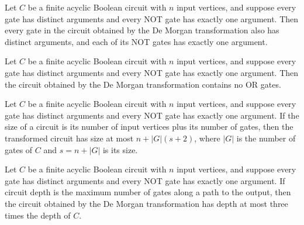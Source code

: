 \begin{theorem}
\label{BoolCircuit.DAGCircuit.deMorgan_isWellFormed}
\leanok
{}
Let $C$ be a finite acyclic Boolean circuit with $n$ input vertices, and suppose every
gate has distinct arguments and every NOT gate has exactly one argument. Then every gate
in the circuit obtained by the De Morgan transformation also has distinct arguments, and
each of its NOT gates has exactly one argument.
\end{theorem}

\begin{theorem}
\label{BoolCircuit.DAGCircuit.deMorgan_kind_ne_or}
\leanok
{}
Let $C$ be a finite acyclic Boolean circuit with $n$ input vertices, and suppose every
gate has distinct arguments and every NOT gate has exactly one argument. Then the
circuit obtained by the De Morgan transformation contains no OR gates.
\end{theorem}

\begin{theorem}
\label{BoolCircuit.DAGCircuit.deMorgan_size_le}
\leanok
{}
Let $C$ be a finite acyclic Boolean circuit with $n$ input vertices, and suppose every
gate has distinct arguments and every NOT gate has exactly one argument. If the size of
a circuit is its number of input vertices plus its number of gates, then the transformed
circuit has size at most $n + |G|(s+2)$, where $|G|$ is the number of gates of $C$ and
$s=n+|G|$ is its size.
\end{theorem}

\begin{theorem}
\label{BoolCircuit.DAGCircuit.deMorgan_depth_le}
\leanok
{}
Let $C$ be a finite acyclic Boolean circuit with $n$ input vertices, and suppose every
gate has distinct arguments and every NOT gate has exactly one argument. If circuit
depth is the maximum number of gates along a path to the output, then the circuit
obtained by the De Morgan transformation has depth at most three times the depth of $C$.
\end{theorem}
